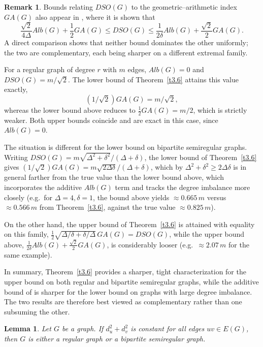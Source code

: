 \documentclass{article}
\newtheorem{lemma}{Lemma}
\theoremstyle{definition}
\newtheorem{remark}{Remark}
\begin{document}
\begin{remark}
Bounds relating $DSO(G)$ to the geometric--arithmetic index $GA(G)$ also appear in \cite{5}, where it is shown that
\[
\frac{\sqrt{2}}{4\Delta}Alb(G)+\frac12 GA(G) \le DSO(G) \le \frac{1}{2\delta}Alb(G)+\frac{\sqrt{2}}{2}GA(G).
\]
A direct comparison shows that neither bound dominates the other uniformly; the two are complementary, each being sharper on a different extremal family.

For a regular graph of degree $r$ with $m$ edges, $Alb(G)=0$ and $DSO(G)=m/\sqrt2$. The lower bound of Theorem~\ref{t3.6} attains this value exactly,
\[
 (1/\sqrt2)GA(G)=m/\sqrt2, 
 \]
 whereas the lower bound above reduces to $\tfrac12 GA(G)=m/2$, which is strictly weaker. Both upper bounds coincide and are exact in this case, since $Alb(G)=0$.

The situation is different for the lower bound on bipartite semiregular graphs.
Writing $DSO(G)=m\sqrt{\Delta^2+\delta^2}/(\Delta+\delta)$, the lower bound of Theorem~\ref{t3.6} gives $(1/\sqrt2)GA(G)=m\sqrt{2\Delta\delta}/(\Delta+\delta)$, which by $\Delta^2+\delta^2\ge 2\Delta\delta$ is in general farther from the true value than the lower bound above, which incorporates the additive $Alb(G)$ term and tracks the degree imbalance more closely (e.g.\ for $\Delta=4,\delta=1$, the bound above yields $\approx 0.665\,m$ versus $\approx 0.566\,m$ from Theorem~\ref{t3.6}, against the true value $\approx 0.825\,m$). 

On the other hand, the upper bound of Theorem~\ref{t3.6} is attained with equality on this family, $\tfrac12\sqrt{\Delta/\delta+\delta/\Delta}\,GA(G)=DSO(G)$, while the upper bound above, $\tfrac1{2\delta}Alb(G)+\tfrac{\sqrt2}{2}GA(G)$, is considerably looser (e.g.\ $\approx 2.07\,m$ for the same example).

In summary, Theorem~\ref{t3.6} provides a sharper, tight characterization for the upper bound on both regular and bipartite semiregular graphs, while the additive bound of \cite{5} is sharper for the lower bound on graphs with large degree imbalance. The two results are therefore best viewed as complementary rather than one subsuming the other.
\end{remark}

\begin{lemma}\label{const}
Let $G$ be a graph.
If $d_u^2+d_v^2$ is constant for all edges $uv\in E(G)$,
then $G$ is either a regular graph or a bipartite semiregular graph.
\end{lemma}
\end{document}
